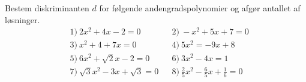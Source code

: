 Bestem diskriminanten $d$ for følgende andengradspolynomier og afgør antallet af løsninger. 
\begin{align*}
	&1) \ 2x^2 + 4x - 2 = 0    &   &2) \ -x^2 + 5x + 7 = 0    \\
	&3) \ x^2 + 4 + 7x = 0    &   &4) \ 5x^2 = -9x + 8    \\
	&5) \ 6x^2 + \sqrt{2}x - 2 = 0    &   &6) \ 3x^2 - 4x = 1    \\
	&7) \ \sqrt{3}x^2 -3x + \sqrt{3} = 0    &   &8) \ \frac{2}{5}x^2 - \frac{6}{5}x + \frac{1}{6} = 0    \\
\end{align*}